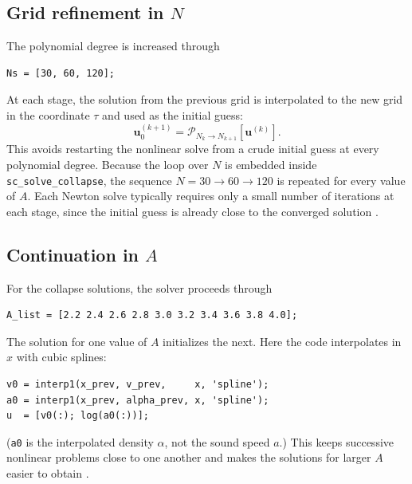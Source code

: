 \documentclass[11pt,a4paper]{article}
\begin{document}
\subsection{Grid refinement in $N$}\label{sec:contN}

The polynomial degree is increased through
\begin{lstlisting}[style=matlab]
Ns = [30, 60, 120];
\end{lstlisting}
At each stage, the solution from the previous grid is interpolated to
the new grid in the coordinate $\tau$ and used as the initial guess:
\begin{equation}
\mathbf u_0^{(k+1)}
=
\mathcal P_{N_k\rightarrow N_{k+1}}
\left[\mathbf u^{(k)}\right].
\label{eq:Ncontinuation}
\end{equation}
This avoids restarting the nonlinear solve from a crude initial guess at
every polynomial degree. Because the loop over $N$ is embedded inside
\texttt{sc\_solve\_collapse}, the sequence $N=30\to60\to120$ is repeated
for every value of $A$. Each Newton solve typically requires only a
small number of iterations at each stage, since the initial guess is
already close to the converged solution \cite{trefethen2000}.

\subsection{Continuation in $A$}\label{sec:contA}

For the collapse solutions, the solver proceeds through
\begin{lstlisting}[style=matlab]
A_list = [2.2 2.4 2.6 2.8 3.0 3.2 3.4 3.6 3.8 4.0];
\end{lstlisting}
The solution for one value of $A$ initializes the next. Here the code
interpolates in $x$ with cubic splines:
\begin{lstlisting}[style=matlab]
v0 = interp1(x_prev, v_prev,     x, 'spline');
a0 = interp1(x_prev, alpha_prev, x, 'spline');
u  = [v0(:); log(a0(:))];
\end{lstlisting}
(\texttt{a0} is the interpolated density $\alpha$, not the sound speed
$a$.) This keeps successive nonlinear problems close to one another and
makes the solutions for larger $A$ easier to obtain \cite{allgower1990}.
\end{document}
